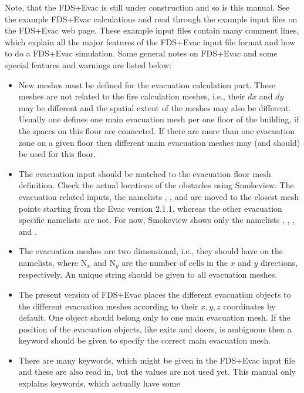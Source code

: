 \documentclass[12pt,a4paper,final,twoside]{stylevk}
\begin{document}
Note, that the FDS+Evac is still under construction and so is this
manual.  See the example FDS+Evac calculations and read through the
example input files on the FDS+Evac web page.  These example input
files contain many comment lines, which explain all the major features
of the FDS+Evac input file format and how to do a FDS+Evac simulation.
Some general notes on FDS+Evac and some special features and warnings
are listed below:
%
\begin{itemize}
%
\item New meshes must be defined for the evacuation calculation part.
  These meshes are not related to the fire calculation meshes,
  i.e., their $dx$ and $dy$ may be different and the spatial
  extent of the meshes may also be different.  Usually one defines one
  main evacuation mesh per one floor of the building, if the spaces on
  this floor are connected.  If there are more than one evacuation
  zone on a given floor then different main evacuation meshes may (and
  should) be used for this floor.
%
\item The evacuation input should be matched to the evacuation floor
  mesh definition.  Check the actual locations of the obstacles using
  Smokeview.  The evacuation related inputs, the namelists
  , , and  are moved to the
  closest mesh points starting from the Evac version 2.1.1, whereas
  the other evacuation specific namelists are not.  For now, Smokeview
  shows only the namelists , , ,
  and .
%
\item The evacuation meshes are two dimensional, i.e., they
  should have  on the 
  namelists, where N${}_x$ and N${}_y$ are the number of cells in the
  $x$ and $y$ directions, respectively.  An unique  string
  should be given to all evacuation meshes.
%
\item The present version of FDS+Evac places the different evacuation
  objects to the different evacuation meshes according to their
  $x,y,z$ coordinates by default.  One object should belong only to
  one main evacuation mesh.  If the position of the evacuation
  objects, like exits and doors, is ambiguous then a keyword
   should be given to specify the correct main
  evacuation mesh.
%
\item There are many keywords, which might be given in the FDS+Evac
  input file and these are also read in, but the values are not used
  yet.  This manual only explains keywords, which actually have some

\end{itemize}
\end{document}
